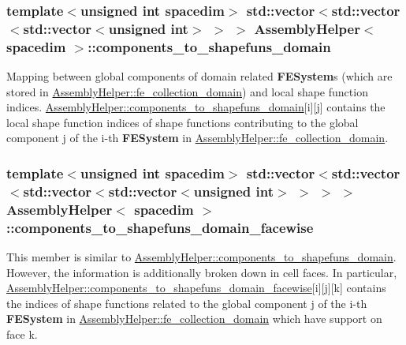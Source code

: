 \subsubsection[{\texorpdfstring{components\+\_\+to\+\_\+shapefuns\+\_\+domain}{components_to_shapefuns_domain}}]{\setlength{\rightskip}{0pt plus 5cm}template$<$unsigned int spacedim$>$ std\+::vector$<$std\+::vector$<$std\+::vector$<$unsigned int$>$ $>$ $>$ {\bf Assembly\+Helper}$<$ spacedim $>$\+::components\+\_\+to\+\_\+shapefuns\+\_\+domain\hspace{0.3cm}{\ttfamily [private]}}\hypertarget{class_assembly_helper_a0bdb6e2e2f9623f3f10dfa2ebe8e234c}{}\label{class_assembly_helper_a0bdb6e2e2f9623f3f10dfa2ebe8e234c}
Mapping between global components of domain related {\bf F\+E\+System}\textquotesingle{}s (which are stored in \hyperlink{class_assembly_helper_af3803b0aad9853e6bf018c70be41e791}{Assembly\+Helper\+::fe\+\_\+collection\+\_\+domain}) and local shape function indices. \hyperlink{class_assembly_helper_a0bdb6e2e2f9623f3f10dfa2ebe8e234c}{Assembly\+Helper\+::components\+\_\+to\+\_\+shapefuns\+\_\+domain}\mbox{[}{\ttfamily i}\mbox{]}\mbox{[}{\ttfamily j}\mbox{]} contains the local shape function indices of shape functions contributing to the global component {\ttfamily j} of the {\ttfamily i-\/th} {\bf F\+E\+System} in \hyperlink{class_assembly_helper_af3803b0aad9853e6bf018c70be41e791}{Assembly\+Helper\+::fe\+\_\+collection\+\_\+domain}. 
\subsubsection[{\texorpdfstring{components\+\_\+to\+\_\+shapefuns\+\_\+domain\+\_\+facewise}{components_to_shapefuns_domain_facewise}}]{\setlength{\rightskip}{0pt plus 5cm}template$<$unsigned int spacedim$>$ std\+::vector$<$std\+::vector$<$std\+::vector$<$std\+::vector$<$unsigned int$>$ $>$ $>$ $>$ {\bf Assembly\+Helper}$<$ spacedim $>$\+::components\+\_\+to\+\_\+shapefuns\+\_\+domain\+\_\+facewise\hspace{0.3cm}{\ttfamily [private]}}\hypertarget{class_assembly_helper_ae92560183f1d2060265f0744a84f0349}{}\label{class_assembly_helper_ae92560183f1d2060265f0744a84f0349}
This member is similar to \hyperlink{class_assembly_helper_a0bdb6e2e2f9623f3f10dfa2ebe8e234c}{Assembly\+Helper\+::components\+\_\+to\+\_\+shapefuns\+\_\+domain}. However, the information is additionally broken down in cell faces. In particular, \hyperlink{class_assembly_helper_ae92560183f1d2060265f0744a84f0349}{Assembly\+Helper\+::components\+\_\+to\+\_\+shapefuns\+\_\+domain\+\_\+facewise}\mbox{[}{\ttfamily i}\mbox{]}\mbox{[}{\ttfamily j}\mbox{]}\mbox{[}{\ttfamily k}\mbox{]} contains the indices of shape functions related to the global component {\ttfamily j} of the {\ttfamily i-\/th} {\bf F\+E\+System} in \hyperlink{class_assembly_helper_af3803b0aad9853e6bf018c70be41e791}{Assembly\+Helper\+::fe\+\_\+collection\+\_\+domain} which have support on face {\ttfamily k}.

